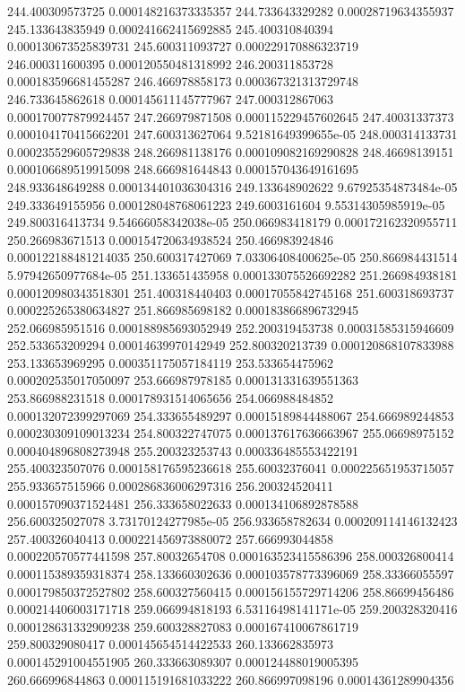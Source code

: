 {244.400309573725 0.000148216373335357
244.733643329282 0.00028719634355937
245.133643835949 0.000241662415692885
245.400310840394 0.000130673525839731
245.600311093727 0.000229170886323719
246.000311600395 0.000120550481318992
246.200311853728 0.000183596681455287
246.466978858173 0.000367321313729748
246.733645862618 0.000145611145777967
247.000312867063 0.000170077879924457
247.266979871508 0.000115229457602645
247.40031337373 0.000104170415662201
247.600313627064 9.52181649399655e-05
248.000314133731 0.000235529605729838
248.266981138176 0.000109082169290828
248.46698139151 0.000106689519915098
248.666981644843 0.000157043649161695
248.933648649288 0.000134401036304316
249.133648902622 9.67925354873484e-05
249.333649155956 0.000128048768061223
249.6003161604 9.55314305985919e-05
249.800316413734 9.54666058342038e-05
250.066983418179 0.000172162320955711
250.266983671513 0.000154720634938524
250.466983924846 0.000122188481214035
250.600317427069 7.03306408400625e-05
250.866984431514 5.97942650977684e-05
251.133651435958 0.000133075526692282
251.266984938181 0.000120980343518301
251.400318440403 0.00017055842745168
251.600318693737 0.000225265380634827
251.866985698182 0.000183866896732945
252.066985951516 0.000188985693052949
252.200319453738 0.00031585315946609
252.533653209294 0.00014639970142949
252.800320213739 0.000120868107833988
253.133653969295 0.000351175057184119
253.533654475962 0.000202535017050097
253.666987978185 0.000131331639551363
253.866988231518 0.000178931514065656
254.066988484852 0.000132072399297069
254.333655489297 0.00015189844488067
254.666989244853 0.000230309109013234
254.800322747075 0.000137617636663967
255.06698975152 0.000404896808273948
255.200323253743 0.000336485553422191
255.400323507076 0.000158176595236618
255.60032376041 0.000225651953715057
255.933657515966 0.000286836006297316
256.200324520411 0.000157090371524481
256.333658022633 0.000134106892878588
256.600325027078 3.73170124277985e-05
256.933658782634 0.000209114146132423
257.400326040413 0.000221456973880072
257.666993044858 0.000220570577441598
257.80032654708 0.000163523415586396
258.000326800414 0.000115389359318374
258.133660302636 0.000103578773396069
258.33366055597 0.000179850372527802
258.600327560415 0.000156155729714206
258.86699456486 0.000214406003171718
259.066994818193 6.53116498141171e-05
259.200328320416 0.000128631332909238
259.600328827083 0.000167410067861719
259.800329080417 0.000145654514422533
260.133662835973 0.000145291004551905
260.333663089307 0.000124488019005395
260.666996844863 0.000115191681033222
260.866997098196 0.00014361289904356
}
